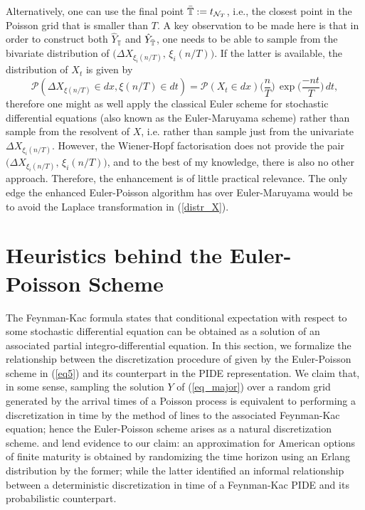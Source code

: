 Alternatively, one can use the final point  $\Bar{\mathbb{T}} := t_{\mathcal{N}_{T}}$, i.e., the closest point in the Poisson grid that is smaller than $T$. A key observation to be made here is that in order to construct both $\hat{Y}_\mathbb{T}$ and $\hat{Y}_{\Bar{\mathbb{T}}}$, one needs to be able to sample from the bivariate distribution of  $\big(\Delta X_{\xi_{i}(n/T)}, \, \xi_{i}(n/T)\big)$. If the latter is  available, the distribution of $X_t$ is given by 
\begin{equation}\label{distr_X}
    \mathcal{P}(\Delta X_{\xi(n/T)} \in dx, \xi(n/T) \in dt) = \mathcal{P}(X_t \in dx) \big(\dfrac{n}{T} \big) \, \exp{\big(\dfrac{-nt}{T} \big)} \, dt,  
\end{equation}
therefore  one might as well apply the classical Euler scheme for stochastic differential equations (also known as the Euler-Maruyama scheme) rather than sample from the resolvent of $X$, i.e. rather than sample just from the univariate $\Delta X_{\xi_{i}(n/T)}$. However, the Wiener-Hopf factorisation does not provide the pair $\big(\Delta X_{\xi_{i}(n/T)}, \, \xi_{i}(n/T)\big)$, and to the best of my knowledge, there is also no other approach. Therefore, the enhancement is of little practical relevance. The only edge the enhanced Euler-Poisson algorithm  has over Euler-Maruyama would be to avoid the Laplace transformation in (\ref{distr_X}).

\section{Heuristics behind the Euler-Poisson Scheme}
The Feynman-Kac formula states that conditional expectation with respect to  some  stochastic differential equation can  be  obtained  as  a  solution  of  an  associated  partial integro-differential equation. In this section, we formalize the relationship between the discretization procedure of given by the Euler-Poisson scheme in (\ref{eq5}) and its counterpart in the PIDE representation. We claim that, in some sense, sampling the solution $Y$ of (\ref{eq_major}) over a random grid generated by the arrival times of a Poisson process is equivalent to performing a discretization in time by the method of lines to the associated Feynman-Kac equation; hence the Euler-Poisson scheme arises as a natural discretization scheme.  and  lend evidence to our claim: an approximation for American options of finite maturity is obtained by randomizing the time horizon using an Erlang distribution by the former; while the latter identified an informal relationship between a deterministic discretization in time of a Feynman-Kac PIDE and its probabilistic counterpart.


